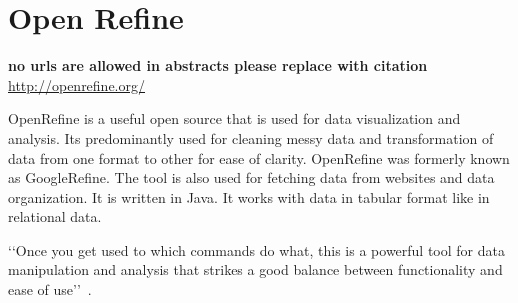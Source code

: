 \section{Open Refine}

{\bf no urls are allowed in abstracts please replace with citation}
\url{http://openrefine.org/}

OpenRefine is a useful open source that is used for data visualization
and analysis.  Its predominantly used for cleaning messy data and
transformation of data from one format to other for ease of clarity.
OpenRefine was formerly known as GoogleRefine. The tool is also used
for fetching data from websites and data organization.
It is written in Java. It works with data in tabular format like in
relational data.

‘‘Once you get used to which commands do what, this is a powerful tool
for data manipulation and analysis that strikes a good balance between
functionality and ease of use’’~\cite{hid-sp18-417-openrefine}.


